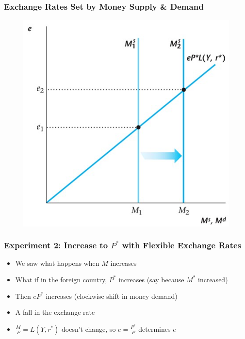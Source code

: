 \documentclass{beamer}
\begin{document}
\begin{frame}
\frametitle[alignment=center]{Exchange Rates Set by Money Supply \& Demand}
\begin{figure}
\centering
\includegraphics[scale=0.73]{Figures/W_Fig_17pt4.png}
\end{figure}
\end{frame}


\begin{frame}
\frametitle[alignment=center]{Experiment 2: Increase to $P^*$ with Flexible Exchange Rates}
\begin{itemize}
\item We saw what happens when $M$ increases
\bigskip
\item What if in the foreign country, $P^*$ increases (say because $M^*$ increased)
\bigskip
\item Then $eP^*$ increases (clockwise shift in money demand)
\bigskip
\item A fall in the exchange rate
\bigskip
\item $\frac{M}{P}=L(Y,r^*)$ doesn't change, so $e=\frac{P^*}{P}$ determines $e$
\end{itemize}
\end{frame}
\end{document}
